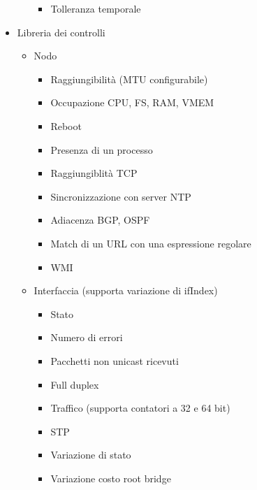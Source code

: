\documentclass[a4wide,10pt,italian]{manual}
\begin{document}
\begin{itemize}
\begin{itemize}
\begin{itemize}
\item {} 
Tolleranza temporale

\end{itemize}

\end{itemize}

\item {} 
Libreria dei controlli
\begin{itemize}
\item {} 
Nodo
\begin{itemize}
\item {} 
Raggiungibilità (MTU configurabile)

\item {} 
Occupazione CPU, FS, RAM, VMEM

\item {} 
Reboot

\item {} 
Presenza di un processo

\item {} 
Raggiungiblità TCP

\item {} 
Sincronizzazione con server NTP

\item {} 
Adiacenza BGP, OSPF

\item {} 
Match di un URL con una espressione regolare

\item {} 
WMI

\end{itemize}

\item {} 
Interfaccia (supporta variazione di ifIndex)
\begin{itemize}
\item {} 
Stato

\item {} 
Numero di errori

\item {} 
Pacchetti non unicast ricevuti

\item {} 
Full duplex

\item {} 
Traffico (supporta contatori a 32 e 64 bit)

\item {} 
STP

\item {} 
Variazione di stato

\item {} 
Variazione costo root bridge


\end{itemize}
\end{itemize}
\end{itemize}
\end{document}
